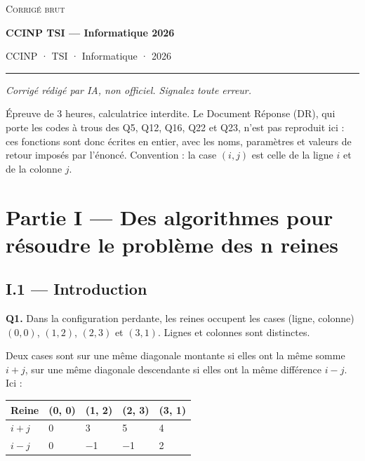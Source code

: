 \documentclass[11pt,a4paper]{article}
\begin{document}
\thispagestyle{plain}
\begin{center}
  {\small\scshape Corrigé brut}\par\smallskip
  {\LARGE\bfseries CCINP TSI — Informatique 2026\par}\medskip
  {\large CCINP · TSI · Informatique · 2026\par}
\end{center}
\vspace{2pt}\hrule\vspace{8pt}

\emph{Corrigé rédigé par IA, non officiel. Signalez toute erreur.}

Épreuve de 3 heures, calculatrice interdite. Le Document Réponse (DR), qui porte les codes à trous des Q5, Q12, Q16, Q22 et Q23, n'est pas reproduit ici : ces fonctions sont donc écrites en entier, avec les noms, paramètres et valeurs de retour imposés par l'énoncé. Convention : la case \((i, j)\) est celle de la ligne \(i\) et de la colonne \(j\).

\hypertarget{partie-i-des-algorithmes-pour-ruxe9soudre-le-probluxe8me-des-n-reines}{%
\section{Partie I --- Des algorithmes pour résoudre le problème des n reines}\label{partie-i-des-algorithmes-pour-ruxe9soudre-le-probluxe8me-des-n-reines}}

\hypertarget{i.1-introduction}{%
\subsection{I.1 --- Introduction}\label{i.1-introduction}}

\textbf{Q1.} Dans la configuration perdante, les reines occupent les cases (ligne, colonne) \((0,0)\), \((1,2)\), \((2,3)\) et \((3,1)\). Lignes et colonnes sont distinctes.

Deux cases sont sur une même diagonale montante si elles ont la même somme \(i+j\), sur une même diagonale descendante si elles ont la même différence \(i-j\). Ici :

\begin{longtable}[]{@{}lllll@{}}
\toprule\noalign{}
Reine & (0, 0) & (1, 2) & (2, 3) & (3, 1) \\
\midrule\noalign{}
\endhead
\bottomrule\noalign{}
\endlastfoot
\(i+j\) & 0 & 3 & 5 & 4 \\
\(i-j\) & 0 & −1 & −1 & 2 \\
\end{longtable}
\end{document}
